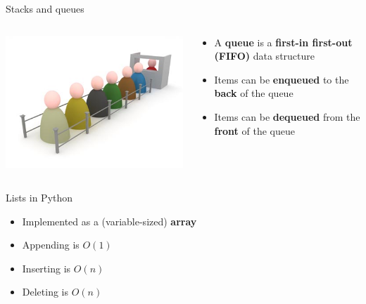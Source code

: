 \begin{frame}{Stacks and queues}
\begin{columns}
\begin{column}{0.3\textwidth}
			\includegraphics[width=\textwidth]{queue}
		\end{column}
		\begin{column}{0.68\textwidth}
			\begin{itemize}
				\item A \textbf{queue} is a \textbf{first-in first-out (FIFO)} data structure
				\pause\item Items can be \textbf{enqueued} to the \textbf{back} of the queue
				\pause\item Items can be \textbf{dequeued} from the \textbf{front} of the queue
			\end{itemize}
		\end{column}
	\end{columns}
\end{frame}

\begin{frame}{Lists in Python}
	\begin{itemize}
		\pause\item Implemented as a (variable-sized) \textbf{array}
		\pause\item Appending is $O(1)$
		\pause\item Inserting is $O(n)$
		\pause\item Deleting is $O(n)$
	\end{itemize}
\end{frame}

